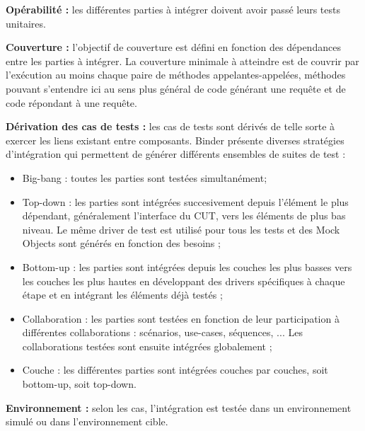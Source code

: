 \textbf{Op\'erabilit\'e : }
   les diff\'erentes parties \`a
   int\'egrer doivent avoir pass\'e leurs tests unitaires.
\par
  
\textbf{Couverture : }
   l'objectif de couverture est d\'efini en
   fonction des d\'ependances entre les parties \`a int\'egrer. La
   couverture minimale \`a atteindre est de couvrir par
   l'ex\'ecution au  moins chaque paire de m\'ethodes
   appelantes-appel\'ees, m\'ethodes pouvant s'entendre  ici au sens
   plus g\'en\'eral de code g\'en\'erant une requ\^ete et de code
   r\'epondant \`a une requ\^ete.
\par
  
\textbf{D\'erivation des cas de tests :}
   les cas de tests sont
   d\'eriv\'es de telle sorte \`a exercer les liens existant entre
   composants. Binder pr\'esente diverses strat\'egies
   d'int\'egration qui permettent de g\'en\'erer diff\'erents
   ensembles de suites de test : 
     
\begin{itemize}
       
\item Big-bang : toutes les parties sont test\'ees
   simultan\'ement; 
\item Top-down : les parties sont  int\'egr\'ees succesivement
   depuis l'\'el\'ement le plus d\'ependant, g\'en\'eralement
   l'interface du CUT, vers les \'el\'ements de plus bas niveau. Le
   m\^eme driver de test est utilis\'e pour tous les tests et des
   Mock Objects sont g\'en\'er\'es en fonction des besoins ; 
\item Bottom-up : les parties sont int\'egr\'ees depuis les
   couches les plus basses vers les couches les plus hautes en
   d\'eveloppant des drivers sp\'ecifiques \`a chaque \'etape et
   en int\'egrant les \'el\'ements d\'ej\`a test\'es ; 
\item Collaboration : les parties sont test\'ees en fonction de
   leur participation \`a diff\'erentes collaborations :
   sc\'enarios, use-cases, s\'equences, ... Les collaborations
   test\'ees sont ensuite int\'egr\'ees globalement ; 
\item Couche : les diff\'erentes parties sont int\'egr\'ees
   couches par couches, soit bottom-up, soit top-down.
\end{itemize}
  
\par
  
\textbf{Environnement :}
   selon les cas, l'int\'egration est
   test\'ee dans un environnement simul\'e ou dans l'environnement
   cible. 
\par
  

